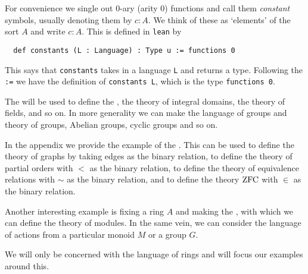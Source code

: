 \begin{dfn}[Language]
  For convenience we single out $0$-ary (arity $0$) functions and
  call them \textit{constant} symbols, usually denoting them by $c : A$.
  We think of these as `elements' of the sort $A$ and write $c : A$.
  This is defined in \texttt{lean} by

  \begin{lstlisting}
  def constants (L : Language) : Type u := functions 0\end{lstlisting}

  This says that \texttt{constants} takes in a language \texttt{L} and returns a type.
  Following the \texttt{:=} we have the definition of \texttt{constants L},
  which is the type \texttt{functions 0}.
\end{dfn}

\begin{eg}
  The 
  will be used to define the ,
  the theory of integral domains, the theory of fields, and so on.
  In more generality we can make the language of groups and
  theory of groups, Abelian groups, cyclic groups and so on.

  In the appendix we provide the example of the
  .
  This can be used to define the theory of graphs by taking edges as the binary relation,
  to define the theory of partial orders with $<$ as the binary relation,
  to define the theory of equivalence relations with $\sim$ as the binary relation,
  and to define the theory $\operatorname{ZFC}$ with $\in$ as the binary relation.

  Another interesting example is fixing a ring $A$ and making
  the ,
  with which we can define the theory of modules.
  In the same vein, we can consider the language of actions from
  a particular monoid $M$ or a group $G$.
\end{eg}

We will only be concerned with the language of rings and will
focus our examples around this.

